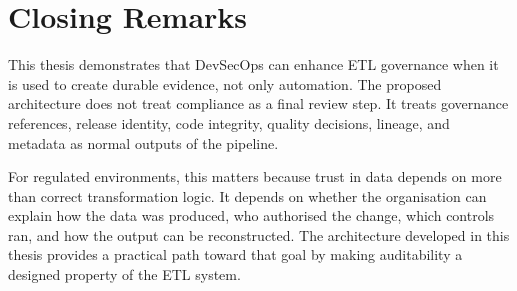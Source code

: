 \section{Closing Remarks}
\noindent
This thesis demonstrates that DevSecOps can enhance ETL governance when it is
used to create durable evidence, not only automation. The proposed architecture
does not treat compliance as a final review step. It treats governance
references, release identity, code integrity, quality decisions, lineage, and
metadata as normal outputs of the pipeline.

For regulated environments, this matters because trust in data depends on more
than correct transformation logic. It depends on whether the organisation can
explain how the data was produced, who authorised the change, which controls
ran, and how the output can be reconstructed. The architecture developed in
this thesis provides a practical path toward that goal by making auditability a
designed property of the ETL system.
